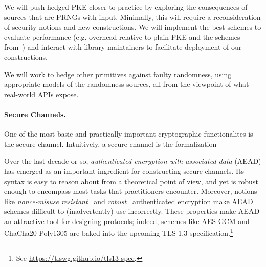 \begin{task}
We will push hedged PKE closer to practice by exploring the
consequences of sources that are PRNGs with input.  Minimally, this will require
a reconsideration of security notions and new constructions.  We will
implement the best schemes to evaluate performance (e.g. overhead
relative to plain PKE and the schemes from~\cite{BPS}) and interact
with library maintainers to facilitate deployment of our constructions.
\end{task}

\begin{task}
We will work to hedge other primitives against faulty randomness,
using appropriate models of the randomness sources, all from the
viewpoint of what real-world APIs expose.
\end{task}


\paragraph{Secure Channels. }  One of the most basic and practically
important cryptographic functionalites is the secure channel.
Intuitively, a secure channel is the formalization
%
Over the last decade or so, \emph{authenticated encryption with associated data}
(AEAD) has emerged as an important ingredient for constructing secure channels.
%
Its syntax is easy to reason about from a theoretical point of view, and yet is
robust enough to encompass most tasks that practitioners encounter. Moreover,
notions like \emph{nonce-misuse resistant}~\cite{RS07} and
\emph{robust}~\cite{HKR14} authenticated encryption make AEAD schemes difficult
to (inadvertently) use incorrectly. These properties make AEAD an attractive
tool for designing protocols; indeed, schemes like AES-GCM and
ChaCha20\mbox{-}Poly1305 are baked into the upcoming TLS 1.3
specification.\footnote{ See \url{https://tlswg.github.io/tls13-spec}.}


